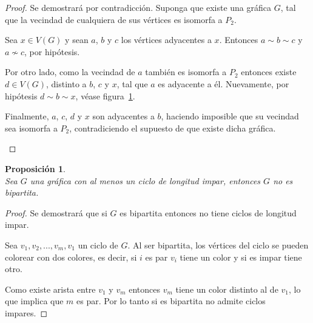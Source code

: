\documentclass[12pt]{book}
\newtheorem{proposition}{Proposición}
\theoremstyle{definition}
\begin{document}
\begin{proof} Se demostrará por contradicción. Suponga que existe una gráfica $G$, tal que la vecindad de cualquiera de sus vértices es isomorfa a $P_2$. 

Sea $x\in V(G)$ y sean $a$, $b$ y $c$ los vértices adyacentes a $x$. Entonces $a\sim b\sim c$ y $a\nsim c$, por hipótesis.

Por otro lado, como la vecindad de $a$ también es isomorfa a $P_2$ entonces existe $d\in V(G)$, distinto a $b$, $c$ y $x$, tal que $a$ es adyacente a \'el. Nuevamente, por hipótesis $d\sim b\sim x$, v\'ease figura~\ref{isomorfp2}.

Finalmente, $a$, $c$, $d$ y $x$ son adyacentes a $b$, haciendo imposible que su vecindad sea isomorfa a $P_2$, contradiciendo el supuesto de que existe dicha gráfica.   


\begin{figure}\centering
  \caption{}\label{isomorfp2}
\end{figure}
\end{proof}



\begin{proposition}\textbf{}\\
  Sea $G$ una gráfica con al menos un ciclo de longitud impar, entonces $G$ no es
  bipartita.
\end{proposition}

\begin{proof} Se demostrará que si $G$ es bipartita entonces no
tiene ciclos de longitud impar.

 Sea $v_1, v_2,..., v_m, v_1$ un ciclo
de $G$. Al ser bipartita, los vértices del ciclo se pueden  colorear con dos
colores, es decir, si $i$ es par $v_i$ tiene un color y si es impar
tiene otro.

 Como existe arista entre $v_1$ y $v_m$ entonces $v_m$
tiene un color distinto al de $v_1$, lo que implica que $m$ es par.
Por lo tanto si es bipartita no admite ciclos impares.
\end{proof}
\end{document}
